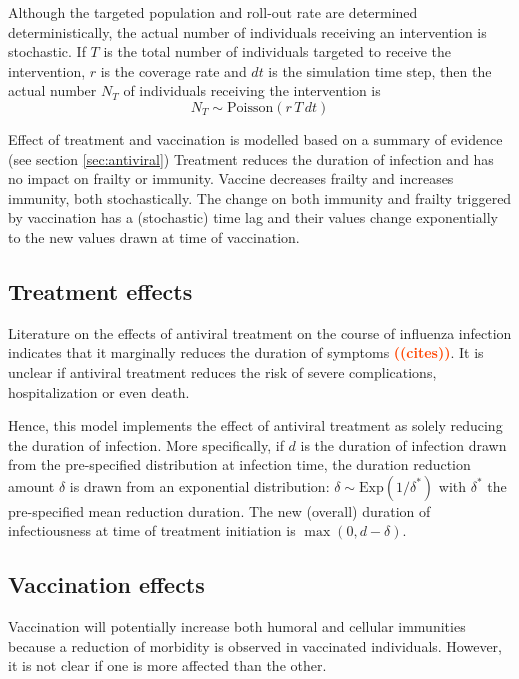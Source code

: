 \documentclass[11pt, onecolumn]{article}
\newcommand{\warning}[1]{\textbf{\textcolor{OrangeRed}{#1}}}
\begin{document}
Although the targeted population and roll-out rate are determined deterministically, the actual number of individuals receiving an intervention is stochastic. If $T$ is the total number of individuals targeted to receive the intervention, $r$ is the coverage rate and $dt$ is the simulation time step, then the actual number $N_T$ of individuals receiving the intervention is
\begin{equation}
N_T \sim \text{Poisson}(r\,T\,dt)
\end{equation}

Effect of treatment and vaccination is modelled based on a summary of evidence (see section \ref{sec:antiviral})
Treatment reduces the duration of infection and has no impact on frailty or immunity. Vaccine decreases frailty and increases immunity, both stochastically. The change on both immunity and frailty triggered by vaccination has a (stochastic) time lag and their values change exponentially to the new values drawn at time of vaccination.

\subsection{Treatment effects}

Literature on the effects of antiviral treatment on the course of influenza infection indicates that it marginally reduces the duration of symptoms \warning{((cites))}. It is unclear if antiviral treatment reduces the risk of severe complications, hospitalization or even death. 

Hence, this model implements the effect of antiviral treatment as solely reducing the duration of infection. More specifically, if $d$ is the duration of infection drawn from the pre-specified distribution at infection time, the duration reduction amount $\delta$ is drawn from an exponential distribution: $\delta \sim \text{Exp}(1/\delta^*)$ with $\delta^*$ the pre-specified mean reduction duration. The new (overall) duration of infectiousness at time of treatment initiation is $\max(0, d-\delta)$.

\subsection{Vaccination effects}

Vaccination will potentially increase both humoral and cellular immunities because a reduction of morbidity is observed in vaccinated individuals. However, it is not clear if one is more affected than the other. 
\end{document}
